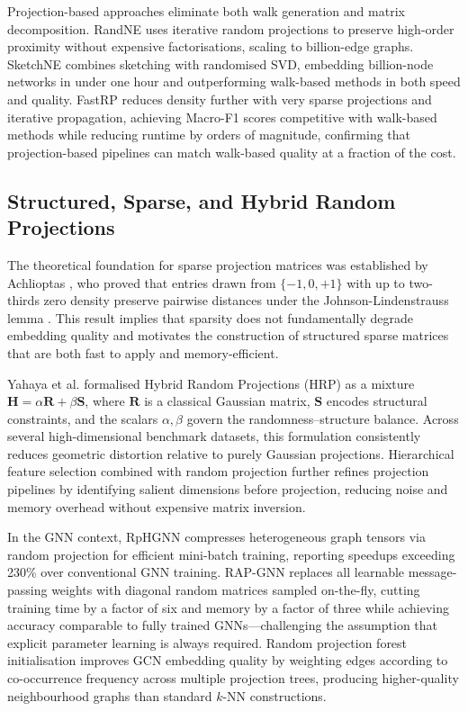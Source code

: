 \documentclass[conference]{IEEEtran}
\begin{document}
Projection-based approaches eliminate both walk generation and matrix
decomposition. RandNE \cite{zhang2018randne} uses iterative random
projections to preserve high-order proximity without expensive
factorisations, scaling to billion-edge graphs. SketchNE
\cite{xie2023sketchne} combines sketching with randomised SVD, embedding
billion-node networks in under one hour and outperforming walk-based methods
in both speed and quality. FastRP \cite{chen2019fast} reduces density
further with very sparse projections and iterative propagation, achieving
Macro-F1 scores competitive with walk-based methods while reducing runtime
by orders of magnitude, confirming that projection-based pipelines can
match walk-based quality at a fraction of the cost.

\subsection{Structured, Sparse, and Hybrid Random Projections}

The theoretical foundation for sparse projection matrices was established
by Achlioptas \cite{achlioptas2003}, who proved that entries drawn from
$\{-1, 0, +1\}$ with up to two-thirds zero density preserve pairwise
distances under the Johnson-Lindenstrauss lemma \cite{johnson1984}.
This result implies that sparsity does not fundamentally degrade embedding
quality and motivates the construction of structured sparse matrices that
are both fast to apply and memory-efficient.

Yahaya et al. \cite{yahaya2025hrp} formalised Hybrid Random Projections
(HRP) as a mixture $\mathbf{H} = \alpha\mathbf{R} + \beta\mathbf{S}$,
where $\mathbf{R}$ is a classical Gaussian matrix, $\mathbf{S}$ encodes
structural constraints, and the scalars $\alpha, \beta$ govern the
randomness--structure balance. Across several high-dimensional benchmark
datasets, this formulation consistently reduces geometric distortion relative
to purely Gaussian projections. Hierarchical feature selection combined
with random projection \cite{wang2019hierarchical} further refines
projection pipelines by identifying salient dimensions before projection,
reducing noise and memory overhead without expensive matrix inversion.

In the GNN context, RpHGNN \cite{hu2021rphgnn} compresses heterogeneous
graph tensors via random projection for efficient mini-batch training,
reporting speedups exceeding 230\% over conventional GNN training.
RAP-GNN \cite{bui2023rap} replaces all learnable message-passing weights
with diagonal random matrices sampled on-the-fly, cutting training time by
a factor of six and memory by a factor of three while achieving accuracy
comparable to fully trained GNNs---challenging the assumption that explicit
parameter learning is always required. Random projection forest
initialisation \cite{alshammari2020rpforest} improves GCN embedding quality
by weighting edges according to co-occurrence frequency across multiple
projection trees, producing higher-quality neighbourhood graphs than
standard $k$-NN constructions.
\end{document}

